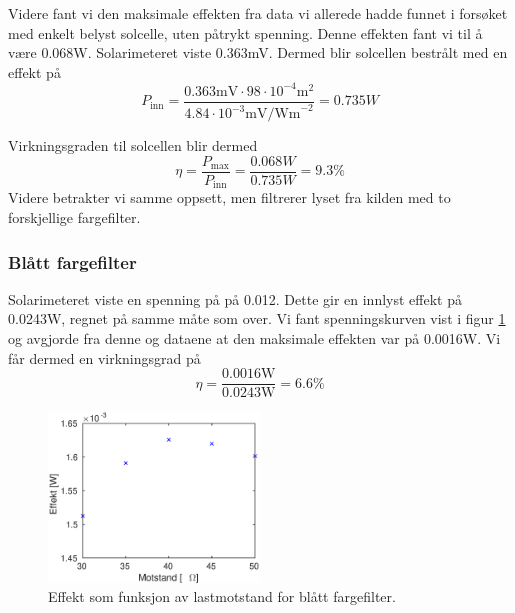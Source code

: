 \documentclass[a4paper,11pt, twocolumn]{article}
\begin{document}
Videre fant vi den maksimale effekten fra data vi allerede hadde funnet i forsøket med enkelt belyst solcelle, uten påtrykt spenning. Denne effekten fant vi til å være 0.068W. Solarimeteret viste 0.363mV. Dermed blir solcellen bestrålt med en effekt på
\begin{equation}
	P_\text{inn} = \frac{0.363\text{mV}\cdot98\cdot10^{-4}\text{m}^2}{4.84\cdot10^{-3}\text{mV/Wm}^{-2}} = 0.735W
\end{equation}

Virkningsgraden til solcellen blir dermed
\begin{equation}
	\eta = \frac{P_\text{max}}{P_\text{inn}} = \frac{0.068W}{0.735W} = 9.3\text{\%}
\end{equation}
Videre betrakter vi samme oppsett, men filtrerer lyset fra kilden med to forskjellige fargefilter.
\subsubsection{Blått fargefilter}
Solarimeteret viste en spenning på på 0.012. Dette gir en innlyst effekt på 0.0243W, regnet på samme måte som over. Vi fant spenningskurven vist i figur \ref{fig:effektBlue} og avgjorde fra denne og dataene at den maksimale effekten var på 0.0016W. Vi får dermed en virkningsgrad på 
\begin{equation}
	\eta = \frac{0.0016\text{W}}{0.0243\text{W}} = 6.6\text{\%}
\end{equation}
\begin{figure}[!ht]
	\includegraphics[width = 0.5\textwidth]{matlab/LAB/effektBlue.eps}
	\caption{Effekt som funksjon av lastmotstand for blått fargefilter.}
	\label{fig:effektBlue}
\end{figure}
\end{document}
